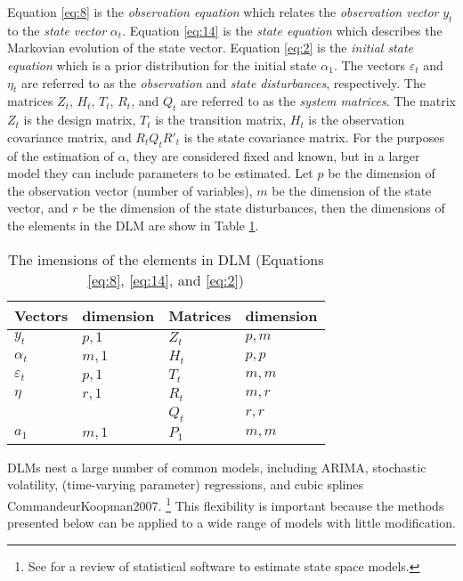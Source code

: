 \documentclass{article}
\begin{document}
Equation \eqref{eq:8} is the \textit{observation equation} which relates the \textit{observation vector} $y_{t}$ to the \textit{state vector} $\alpha_{t}$.
Equation \eqref{eq:14} is the \textit{state equation} which describes the Markovian evolution of the state vector.
Equation \eqref{eq:2} is the \textit{initial state equation} which is a prior distribution for the initial state $\alpha_{1}$.
The vectors $\varepsilon_{t}$ and $\eta_{t}$ are referred to as the \textit{observation} and \textit{state disturbances}, respectively.
The matrices $Z_{t}$, $H_{t}$, $T_{t}$, $R_{t}$, and $Q_{t}$ are referred to as the \textit{system matrices}.
The matrix $Z_{t}$ is the design matrix, $T_{t}$ is the transition matrix, $H_{t}$ is the observation covariance matrix, and $R_{t} Q_{t} R'_{t}$ is the state covariance matrix.
For the purposes of the estimation of $\alpha$, they are considered fixed and known, but in a larger model they can include parameters to be estimated.
Let $p$ be the dimension of the observation vector (number of variables), $m$ be the dimension of the state vector, and $r$ be the dimension of the state disturbances, then the dimensions of the elements in the DLM are show in Table \ref{tab:state_space_dim}.
\begin{table}[!]
  \centering
\begin{tabular}{llll}
  Vectors & dimension & Matrices & dimension \\
\hline
  $y_t$     & $p, 1$ & $Z_{t}$  & $p, m$ \\
  $\alpha_{t}$ & $m, 1$ & $H_{t}$  & $p, p$ \\
  $\varepsilon_t$ & $p, 1$ & $T_{t}$ & $m, m$ \\
  $\eta$ & $r, 1$ & $R_t$ & $m, r$ \\
   &  & $Q_t$ & $r, r$ \\
  $a_{1}$ & $m, 1$ & $P_{1}$ & $m, m$
\end{tabular}
  \caption{The imensions of the elements in DLM (Equations \eqref{eq:8}, \eqref{eq:14}, and \eqref{eq:2})}
  \label{tab:state_space_dim}
\end{table}

DLMs nest a large number of common models, including ARIMA, stochastic volatility, (time-varying parameter) regressions,
and cubic splines \parencites{WestHarrison1997}{DurbinKoopman2001}\parencite{PetrisPetroneEtAl2009}{CommandeurKoopman2007}.%
\footnote{See \textcite{CommandeurKoopmanOoms2011} for a review of statistical software to estimate state space models.}
This flexibility is important because the methods presented below can be applied to a wide range of models with little modification.
\end{document}
